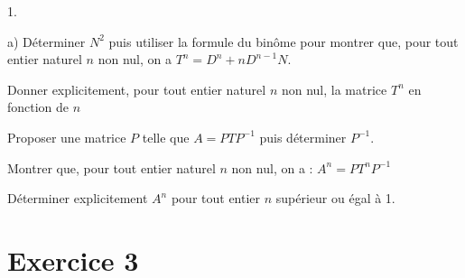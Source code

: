 \documentclass[11pt]{article}%
\begin{document}
\begin{noliste}{1.}
\begin{noliste}{a)}
Déterminer $N^{2}$ puis utiliser la formule du bin\^{o}me pour montrer
que, pour tout entier naturel $n$ non nul, on a $T^{n} = D^{n} +
nD^{n-1}N.$

\item Donner explicitement, pour tout entier naturel $n$ non nul, la
matrice
$T^{n}$ en fonction de $n$

\item Proposer une matrice $P$ telle que $A = PTP^{-1}$ puis déterminer
$P^{-1}$.

\item Montrer que, pour tout entier naturel $n$ non nul, on a : $A^{n}
= PT^{n}P^{-1}$

\item Déterminer explicitement $A^{n}$ pour tout entier $n$ supérieur
ou égal à 1.
\end{noliste}
\end{noliste}

\section*{Exercice 3}
\end{document}
